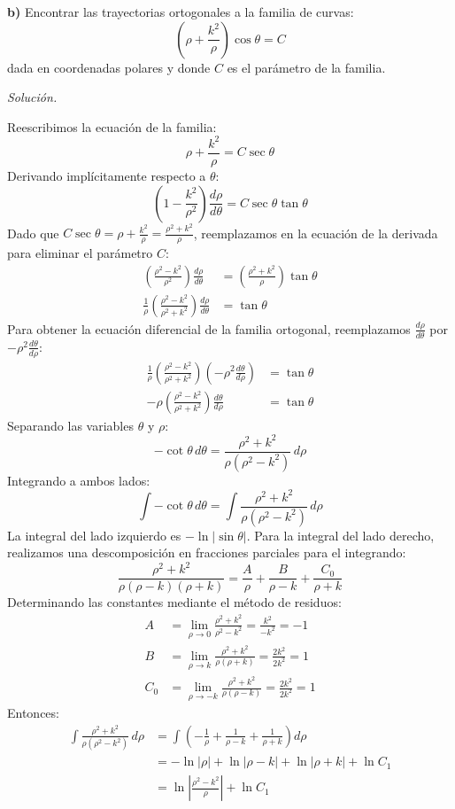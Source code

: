 \documentclass[12pt,letterpaper]{article}
\begin{document}
\medskip
\textbf{b)} Encontrar las trayectorias ortogonales a la familia de curvas:
\[
  \left(\rho + \frac{k^2}{\rho}\right) \cos\theta = C
\]
dada en coordenadas polares y donde $C$ es el parámetro de la familia.

\medskip
\textit{Solución.}

Reescribimos la ecuación de la familia:
\[
  \rho + \frac{k^2}{\rho} = C\sec\theta
\]
Derivando implícitamente respecto a $\theta$:
\[
  \left(1 - \frac{k^2}{\rho^2}\right)\frac{d\rho}{d\theta} = C\sec\theta\tan\theta
\]
Dado que $C\sec\theta = \rho + \frac{k^2}{\rho} = \frac{\rho^2+k^2}{\rho}$, reemplazamos en la ecuación de la derivada para eliminar el parámetro $C$:
\begin{align*}
  \left(\frac{\rho^2-k^2}{\rho^2}\right)\frac{d\rho}{d\theta} &= \left(\frac{\rho^2+k^2}{\rho}\right)\tan\theta \\
  \frac{1}{\rho}\left(\frac{\rho^2-k^2}{\rho^2+k^2}\right)\frac{d\rho}{d\theta} &= \tan\theta
\end{align*}
Para obtener la ecuación diferencial de la familia ortogonal, reemplazamos $\frac{d\rho}{d\theta}$ por $-\rho^2 \frac{d\theta}{d\rho}$:
\begin{align*}
  \frac{1}{\rho}\left(\frac{\rho^2-k^2}{\rho^2+k^2}\right)\left(-\rho^2 \frac{d\theta}{d\rho}\right) &= \tan\theta \\
  -\rho\left(\frac{\rho^2-k^2}{\rho^2+k^2}\right)\frac{d\theta}{d\rho} &= \tan\theta
\end{align*}
Separando las variables $\theta$ y $\rho$:
\[
  -\cot\theta\,d\theta = \frac{\rho^2+k^2}{\rho(\rho^2-k^2)}\,d\rho
\]
Integrando a ambos lados:
\[
  \int -\cot\theta\,d\theta = \int \frac{\rho^2+k^2}{\rho(\rho^2-k^2)}\,d\rho
\]
La integral del lado izquierdo es $-\ln|\sin\theta|$. Para la integral del lado derecho, realizamos una descomposición en fracciones parciales para el integrando:
\[
  \frac{\rho^2+k^2}{\rho(\rho-k)(\rho+k)} = \frac{A}{\rho} + \frac{B}{\rho-k} + \frac{C_0}{\rho+k}
\]
Determinando las constantes mediante el método de residuos:
\begin{align*}
  A &= \lim_{\rho\to 0} \frac{\rho^2+k^2}{\rho^2-k^2} = \frac{k^2}{-k^2} = -1 \\
  B &= \lim_{\rho\to k} \frac{\rho^2+k^2}{\rho(\rho+k)} = \frac{2k^2}{2k^2} = 1 \\
  C_0 &= \lim_{\rho\to -k} \frac{\rho^2+k^2}{\rho(\rho-k)} = \frac{2k^2}{2k^2} = 1
\end{align*}
Entonces:
\begin{align*}
  \int \frac{\rho^2+k^2}{\rho(\rho^2-k^2)}\,d\rho &= \int \left(-\frac{1}{\rho} + \frac{1}{\rho-k} + \frac{1}{\rho+k}\right)d\rho \\
  &= -\ln|\rho| + \ln|\rho-k| + \ln|\rho+k| + \ln C_1 \\
  &= \ln\left|\frac{\rho^2-k^2}{\rho}\right| + \ln C_1
\end{align*}
\end{document}
